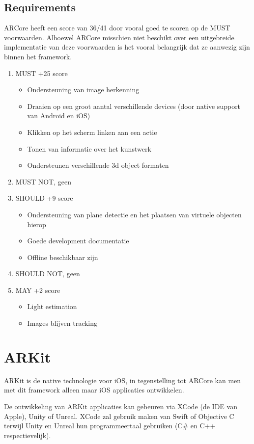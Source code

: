\subsection{Requirements}
ARCore heeft een score van 36/41 door vooral goed te scoren op de MUST voorwaarden. Alhoewel ARCore misschien niet beschikt over een uitgebreide implementatie van deze voorwaarden is het vooral belangrijk dat ze aanwezig zijn binnen het framework.
\begin{enumerate}
    \item MUST +25 score
    \begin{itemize}
       \item Ondersteuning van image herkenning
       \item Draaien op een groot aantal verschillende devices (door native support van Android en iOS)
       \item Klikken op het scherm linken aan een actie 
       \item Tonen van informatie over het kunstwerk
       \item Ondersteunen verschillende 3d object formaten
    \end{itemize}
    \item MUST NOT, geen
    \item SHOULD +9 score
    \begin{itemize}
    \item Ondersteuning van plane detectie en het plaatsen van virtuele objecten hierop
    \item Goede development documentatie
    \item Offline beschikbaar zijn
    \end{itemize}
    \item SHOULD NOT, geen
    \item MAY +2 score
    \begin{itemize}
        \item Light estimation
        \item Images blijven tracking
    \end{itemize}
\end{enumerate}

\section{ARKit}
ARKit is de native technologie voor iOS, in tegenstelling tot ARCore kan men met dit framework alleen maar iOS applicaties ontwikkelen.

De ontwikkeling van ARKit applicaties kan gebeuren via XCode (de IDE van Apple), Unity of Unreal. XCode zal gebruik maken van Swift of Objective C terwijl Unity en Unreal hun programmeertaal gebruiken (C\# en C++ respectievelijk).

